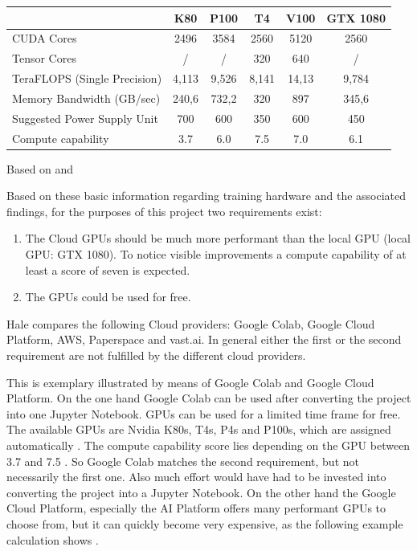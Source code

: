 \begin{center}
	\begin{tabular}[H]{l|c|c|c|c|c|}
		& K80 & P100 & T4 & V100 & GTX 1080 \\
		\hline
		CUDA Cores & 2496 & 3584 & 2560 & 5120 & 2560 \\
		Tensor Cores & / & / & 320 & 640 & / \\
		TeraFLOPS (Single Precision) & 4,113 & 9,526 & 8,141 & 14,13 & 9,784  \\
		Memory Bandwidth (GB/sec) & 240,6 & 732,2 & 320 & 897 & 345,6 \\
		Suggested Power Supply Unit & 700 & 600 & 350 & 600 & 450 \\
		Compute capability & 3.7 & 6.0 & 7.5 & 7.0 & 6.1 \\ 
	\end{tabular}
	\label{table:hardware}
	Based on \cite{TechPowerUp} and \cite{Nvidia}
\end{center}


Based on these basic information regarding training hardware and the associated findings, for the purposes of this project two requirements exist:
\begin{enumerate}
	\item The Cloud GPUs should be much more performant than the local GPU (local GPU: GTX 1080). To notice visible improvements a compute capability of at least a score of seven is expected.
	\item The GPUs could be used for free.
\end{enumerate}

Hale \cite{Hale2019} compares the following Cloud providers: Google Colab, Google Cloud Platform, AWS, Paperspace and vast.ai. In general either the first or the second requirement are not fulfilled by the different cloud providers. 

This is exemplary illustrated by means of Google Colab and Google Cloud Platform. 
On the one hand Google Colab can be used after converting the project into one Jupyter Notebook. GPUs can be used for a limited time frame for free. The available GPUs are Nvidia K80s, T4s, P4s and P100s, which are assigned automatically \cite{Colab2021}. The compute capability score lies depending on the GPU between 3.7 and 7.5 \cite{Nvidia}. So Google Colab matches the second requirement, but not necessarily the first one. Also much effort would have had to be invested into converting the project into a Jupyter Notebook. 
On the other hand the Google Cloud Platform, especially the AI Platform offers many performant GPUs to choose from, but it can quickly become very expensive, as the following example calculation shows \cite{GCP2021}. 

